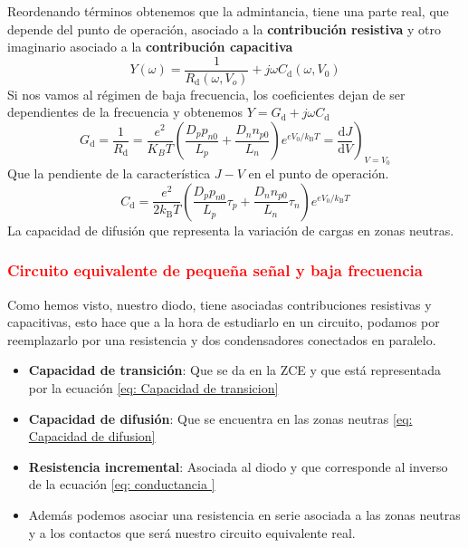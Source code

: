 Reordenando términos obtenemos que la admintancia, tiene una parte real, que depende del punto de operación, asociado a la \textbf{contribución resistiva} y otro imaginario asociado a la \textbf{contribución capacitiva}
\begin{equation}
    Y(\omega)=\frac{1}{R_\mathrm{d}\left(\omega, V_o\right)}+j \omega C_\mathrm{d}\left(\omega, V_0\right)
    \label{eq: admitancia general}
\end{equation}
Si nos vamos al régimen de baja frecuencia, los coeficientes dejan de ser dependientes de la frecuencia y obtenemos $Y=G_\mathrm{d}+j\omega C_\mathrm{d}$
\begin{equation}
 \left.G_\mathrm{d}=\frac{1}{R_\mathrm{d}}=\frac{e^2}{K_B T}\left(\frac{D_p p_{n 0}}{L_p}+\frac{D_n n_{p 0}}{L_n}\right) e^{e V_0 / k_\mathrm{B}T}=\frac{\mathrm{d} J}{\mathrm{d} V}\right)_{V=V_0}
 \label{eq: conductancia }
 \end{equation}
 Que la pendiente de la característica $J-V$ en el punto de operación.
 \begin{equation}
 C_\mathrm{d}=\frac{e^2}{2 k_\mathrm{B} T}\left(\frac{D_p p_{n 0}}{L_p} \tau_p+\frac{D_n n_{p 0}}{L_n} \tau_n\right) e^{e V_0 / k_\mathrm{B} T}    
 \label{eq: Capacidad de difusion}
 \end{equation}
La capacidad de difusión que representa la variación de cargas en zonas neutras.
\subsubsection{\textcolor{red}{Circuito equivalente de pequeña señal y baja frecuencia}}
Como hemos visto, nuestro diodo, tiene asociadas contribuciones resistivas y capacitivas, esto hace que a la hora de estudiarlo en un circuito, podamos por reemplazarlo por una resistencia y dos condensadores conectados en paralelo.
\begin{itemize}
    \item \textbf{Capacidad de transición}: Que se da en la ZCE y que está representada por la ecuación \ref{eq: Capacidad de transicion}
    \item \textbf{Capacidad de difusión}: Que se encuentra en las zonas neutras \ref{eq: Capacidad de difusion}
    \item \textbf{Resistencia incremental}: Asociada al diodo y que corresponde al inverso de la ecuación \ref{eq: conductancia }
    \item Además podemos asociar una resistencia en serie asociada a las zonas neutras y a los contactos que será nuestro circuito equivalente real.    
\end{itemize}


